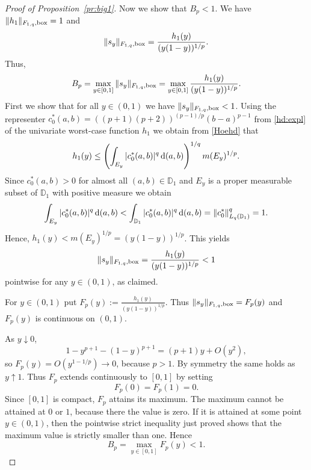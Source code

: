 \documentclass[12pt]{article}
\theoremstyle{remark}
\theoremstyle{definition}
\newcommand{\D}{\mathbb{D}}
\newcommand{\bx}{{\rm box}}
\newcommand{\rd}{\,{\rm d}}
\newcommand{\<}{\langle}
\renewcommand{\>}{\rangle}
\begin{document}
\begin{appendix}
\begin{proof}[Proof of Proposition~\ref{pr:big1}]
Now we show that $B_p<1$. We have $\|h_1\|_{F_{1,q},\bx}=1$ and $$\|s_y\|_{F_{1,q},\bx}=\frac{h_1(y)}{(y(1-y))^{1/p}}.$$ Thus, $$B_p=\max_{y \in [0,1]} \|s_y\|_{F_{1,q},\bx}=\max_{y \in [0,1]}\frac{h_1(y)}{(y(1-y))^{1/p}}.$$ First we show that for all $y \in (0,1)$ we have $\|s_y\|_{F_{1,q},\bx} < 1$. Using the representer $c_0^{\ast}(a,b)=((p+1)(p+2))^{(p-1)/p}(b-a)^{p-1}$ from \eqref{hd:expl} of the univariate worst-case function $h_1$ we obtain from \eqref{Hoehd} that $$h_1(y) \le \left(\int_{E_y} |c_0^{\ast}(a,b)|^q \rd(a,b)\right)^{1/q} m(E_y)^{1/p}.$$ Since $c_0^{\ast}(a,b)>0$ for almost all $(a,b) \in \D_1$ and $E_y$ is a proper measurable subset of $\D_1$ with positive measure we obtain $$\int_{E_y} |c_0^{\ast}(a,b)|^q \rd(a,b) < \int_{\D_1} |c_0^{\ast}(a,b)|^q \rd(a,b)=\|c_0^{\ast}\|_{L_q(\D_1)}^q=1.$$ Hence, $h_1(y) < m(E_y)^{1/p}=(y(1-y))^{1/p}$. This yields $$\|s_y\|_{F_{1,q},\bx}=\frac{h_1(y)}{(y(1-y))^{1/p}} <1$$ pointwise for any $y \in (0,1)$, as claimed. 

For $y \in (0,1)$ put $F_p(y):=\frac{h_1(y)}{(y(1-y))^{1/p}}$. Thus $\|s_y\|_{F_{1,q},\bx}=F_p(y)$ and $F_p(y)$ is continuous on $(0,1)$.

As $y \downarrow 0$, $$1-y^{p+1}-(1-y)^{p+1}=(p+1)y+O(y^2),$$ so $F_p(y)=O(y^{1-1/p}) \rightarrow 0$, because $p>1$. By symmetry the same holds as $y \uparrow 1$. Thus $F_p$ extends continuously to $[0,1]$ by setting $$F_p(0)=F_p(1)=0.$$ Since $[0,1]$ is compact, $F_p$ attains its maximum. The maximum cannot be attained at $0$ or $1$, because there the value is zero. If it is attained at some point $y \in (0, 1)$, then the pointwise strict inequality just proved shows that the maximum value is strictly smaller than one. Hence $$B_p = \max_{y \in [0,1]} F_p(y) < 1.$$
\end{proof}



\end{appendix}
\end{document}
